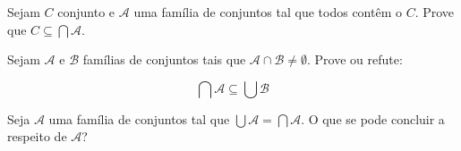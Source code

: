 \begin{exercise}
Sejam $C$ conjunto e $\mathscr A$ uma família de conjuntos tal que todos contêm o $C$. Prove que $C \subseteq \bigcap \mathscr A$. 
\end{exercise}

\begin{exercise}
Sejam $\mathscr A$ e $\mathscr B$ famílias de conjuntos tais que $\mathscr A \cap \mathscr B \ne \emptyset$. Prove ou refute:

\begin{equation*}
\bigcap \mathscr A \subseteq \bigcup \mathscr B
\end{equation*}
\end{exercise}

\begin{exercise}
Seja $\mathscr A$ uma família de conjuntos tal que $\bigcup \mathscr A = \bigcap \mathscr A$. O que se pode concluir a respeito de $\mathscr A$?
\end{exercise}